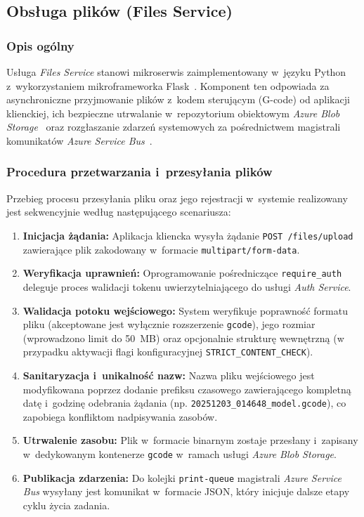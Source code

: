 \documentclass[a4paper,12pt,reqno]{article}
\begin{document}
\subsection{Obsługa plików (Files Service)}

\subsubsection{Opis ogólny}

Usługa \textit{Files Service} stanowi mikroserwis zaimplementowany w~języku Python~\cite{python} z~wykorzystaniem mikroframeworka Flask~\cite{flask}. Komponent ten odpowiada za asynchroniczne przyjmowanie plików z~kodem sterującym (G-code) od aplikacji klienckiej, ich bezpieczne utrwalanie w~repozytorium obiektowym \textit{Azure Blob Storage}~\cite{blobstorage} oraz rozgłaszanie zdarzeń systemowych za pośrednictwem magistrali komunikatów \textit{Azure Service Bus}~\cite{servicebus}.

\subsubsection{Procedura przetwarzania i~przesyłania plików}

Przebieg procesu przesyłania pliku oraz jego rejestracji w~systemie realizowany jest sekwencyjnie według następującego scenariusza:

\begin{enumerate}
	\item \textbf{Inicjacja żądania:} Aplikacja kliencka wysyła żądanie \texttt{POST /files/upload} zawierające plik zakodowany w~formacie \texttt{multipart/form-data}.
	\item \textbf{Weryfikacja uprawnień:} Oprogramowanie pośredniczące \texttt{require\_auth} deleguje proces walidacji tokenu uwierzytelniającego do usługi \textit{Auth Service}.
	\item \textbf{Walidacja potoku wejściowego:} System weryfikuje poprawność formatu pliku (akceptowane jest wyłącznie rozszerzenie \texttt{gcode}), jego rozmiar (wprowadzono limit do 50~MB) oraz opcjonalnie strukturę wewnętrzną (w przypadku aktywacji flagi konfiguracyjnej \texttt{STRICT\_CONTENT\_CHECK}).
	\item \textbf{Sanitaryzacja i~unikalność nazw:} Nazwa pliku wejściowego jest modyfikowana poprzez dodanie prefiksu czasowego zawierającego kompletną datę i~godzinę odebrania żądania (np. \texttt{20251203\_014648\_model.gcode}), co zapobiega konfliktom nadpisywania zasobów.
	\item \textbf{Utrwalenie zasobu:} Plik w~formacie binarnym zostaje przesłany i~zapisany w~dedykowanym kontenerze \texttt{gcode} w~ramach usługi \textit{Azure Blob Storage}.
	\item \textbf{Publikacja zdarzenia:} Do kolejki \texttt{print-queue} magistrali \textit{Azure Service Bus} wysyłany jest komunikat w~formacie JSON, który inicjuje dalsze etapy cyklu życia zadania.
\end{enumerate}
\end{document}
